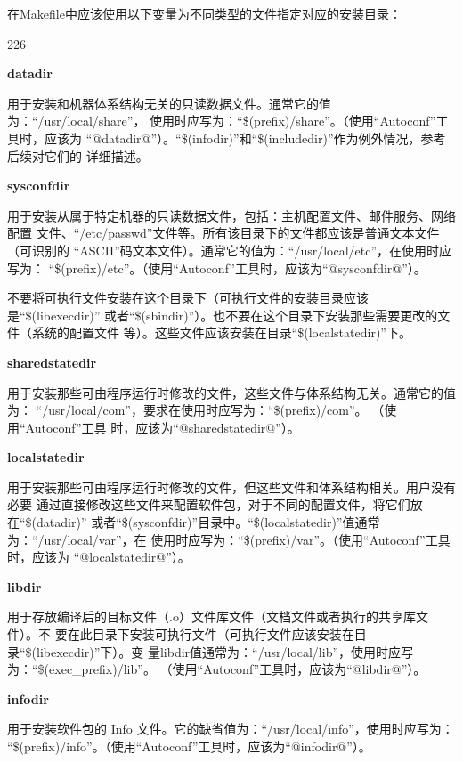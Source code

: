 在Makefile中应该使用以下变量为不同类型的文件指定对应的安装目录：
\begin{dinglist}{226}
\itemsep=4pt \parskip=0pt

\item \textbf{datadir}

用于安装和机器体系结构无关的只读数据文件。通常它的值为：“/usr/local/share”，
使用时应写为：“\$(prefix)/share”。（使用“Autoconf”工具时，应该为
“@datadir@”）。“\$(infodir)”和“\$(includedir)”作为例外情况，参考后续对它们的
详细描述。

\item \textbf{sysconfdir}

用于安装从属于特定机器的只读数据文件，包括：主机配置文件、邮件服务、网络配置
文件、“/etc/passwd”文件等。所有该目录下的文件都应该是普通文本文件（可识别的
“ASCII”码文本文件）。通常它的值为：“/usr/local/etc”，在使用时应写为：
“\$(prefix)/etc”。（使用“Autoconf”工具时，应该为“@sysconfdir@”）。

不要将可执行文件安装在这个目录下（可执行文件的安装目录应该是“\$(libexecdir)”
或者“\$(sbindir)”）。也不要在这个目录下安装那些需要更改的文件（系统的配置文件
等）。这些文件应该安装在目录“\$(localstatedir)”下。

\item \textbf{sharedstatedir}

用于安装那些可由程序运行时修改的文件，这些文件与体系结构无关。通常它的值为：
“/usr/local/com”，要求在使用时应写为：“\$(prefix)/com”。 （使用“Autoconf”工具
时，应该为“@sharedstatedir@”）。

\item \textbf{localstatedir}

用于安装那些可由程序运行时修改的文件，但这些文件和体系结构相关。用户没有必要
通过直接修改这些文件来配置软件包，对于不同的配置文件，将它们放在“\$(datadir)”
或者“\$(sysconfdir)”目录中。“\$(localstatedir)”值通常为：“/usr/local/var”，在
使用时应写为：“\$(prefix)/var”。（使用“Autoconf”工具时，应该为
“@localstatedir@”）。


\item \textbf{libdir}

用于存放编译后的目标文件（.o）文件库文件（文档文件或者执行的共享库文件）。不
要在此目录下安装可执行文件（可执行文件应该安装在目录“\$(libexecdir)”下）。变
量libdir值通常为：“/usr/local/lib”，使用时应写为：“\$(exec\_prefix)/lib”。
（使用“Autoconf”工具时，应该为“@libdir@”）。


\item \textbf{infodir}

用于安装软件包的 Info 文件。它的缺省值为：“/usr/local/info”，使用时应写为：
“\$(prefix)/info”。（使用“Autoconf”工具时，应该为“@infodir@”）。


\end{dinglist}

